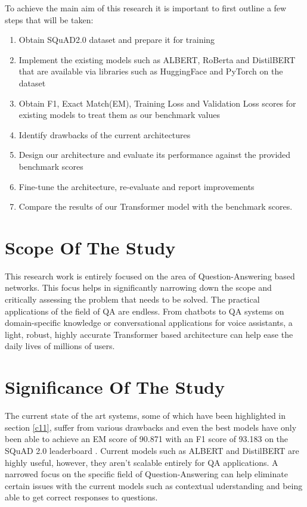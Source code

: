 \documentclass[a4paper,12pt]{report}
\begin{document}
        	To achieve the main aim of this research it  is important to first outline a few steps that will be taken:
        \begin{enumerate}
        	\item Obtain SQuAD2.0 dataset and prepare it for training
        	\item Implement the existing models such as ALBERT, RoBerta and DistilBERT that are available via libraries such as HuggingFace \citep{hfTransformers} and PyTorch  on the dataset
        	\item Obtain F1, Exact Match(EM), Training Loss and Validation Loss scores for existing models to treat them as our benchmark values
        	\item Identify drawbacks of the current architectures
        	\item Design our architecture and evaluate its performance against the provided benchmark scores
        	\item Fine-tune the architecture, re-evaluate and report improvements
        	\item Compare the results of our Transformer model with the benchmark scores.
        \end{enumerate}

        \section{Scope Of The Study}\label{13}

        This research work is entirely focused on the area of Question-Answering based networks. This focus helps in significantly narrowing down the scope and critically assessing the problem that needs to be solved. The practical applications of the field of QA are endless. From chatbots to QA systems on domain-specific knowledge or conversational applications for voice assistants, a light, robust, highly accurate Transformer based architecture can help ease the daily lives of millions of users.

        \section{Significance Of The Study}\label{14}

        The current state of the art systems, some of which have been highlighted in section \ref{c11}, suffer from various drawbacks and even the best models have only been able to achieve an EM score of 90.871 with an F1 score of 93.183 on the SQuAD 2.0 leaderboard \citep{squad}. Current models such as ALBERT and DistilBERT are highly useful, however, they aren't scalable entirely for QA applications. A narrowed focus on the specific field of Question-Answering can help eliminate certain issues with the current models such as contextual uderstanding and being able to get correct responses to questions.
\end{document}
